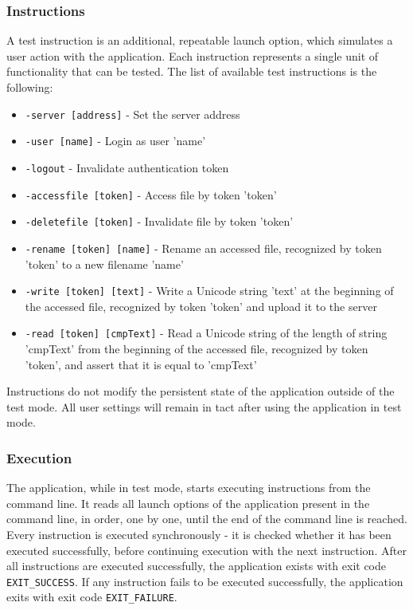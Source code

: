 \subsubsection{Instructions}
A test instruction is an additional, repeatable launch option, which simulates a user action with the application. Each instruction represents a single unit of functionality that can be tested. The list of available test instructions is the following:
\begin{itemize}
    \item \lstinline{-server [address]} - Set the server address
    \item \lstinline{-user [name]} - Login as user 'name'
    \item \lstinline{-logout} - Invalidate authentication token
    \item \lstinline{-accessfile [token]} - Access file by token 'token'
    \item \lstinline{-deletefile [token]} - Invalidate file by token 'token'
    \item \lstinline{-rename [token] [name]} - Rename an accessed file, recognized by token 'token' to a new filename 'name'
    \item \lstinline{-write [token] [text]} - Write a Unicode string 'text' at the beginning of the accessed file, recognized by token 'token' and upload it to the server
    \item \lstinline{-read [token] [cmpText]} - Read a Unicode string of the length of string 'cmpText' from the beginning of the accessed file, recognized by token 'token', and assert that it is equal to 'cmpText'
    
\end{itemize}
Instructions do not modify the persistent state of the application outside of the test mode. All user settings will remain in  tact after using the application in test mode.

\subsubsection{Execution}
The application, while in test mode, starts executing instructions from the command line. It reads all launch options of the application present in the command line, in order, one by one, until the end of the command line is reached. Every instruction is executed synchronously - it is checked whether it has been executed successfully, before continuing execution with the next instruction. After all instructions are executed successfully, the application exists with exit code \lstinline{EXIT_SUCCESS}. If any instruction fails to be executed successfully, the application exits with exit code \lstinline{EXIT_FAILURE}.

